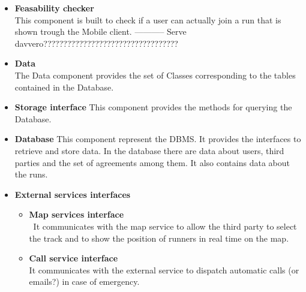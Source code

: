 \begin{legal}
\begin{itemize}
{				}\\
		\item{\textbf{Feasability checker}\\
		This component is built to check if a user can actually join a run that is shown trough the Mobile client.
		----------- Serve davvero??????????????????????????????????
				}\\
		\item{\textbf{Data}\\
		The Data component provides the set of Classes corresponding to the tables contained in the Database.
				}\\
		\item{\textbf{Storage interface}
		This component provides the methods for querying the Database.
				}\\
		\item{\textbf{Database}
		This component represent the DBMS. It provides the interfaces to retrieve and store data. In the database there are data about users, third parties and the set of agreements among them. It also contains data about the runs.
				}\\
		\item{\textbf{External services interfaces}\\
      	\begin{itemize}
      	\item{\textbf{Map services interface}\\\
      	It communicates with the map service to allow the third party to select the track and to show the position of runners in real time on the map.
					}\\
			\item{\textbf{Call service interface}\\
			It communicates with the external service to dispatch automatic calls (or emails?) in case of emergency.
					}\\
      	\end{itemize}
				}
		\end{itemize}


\end{legal}
